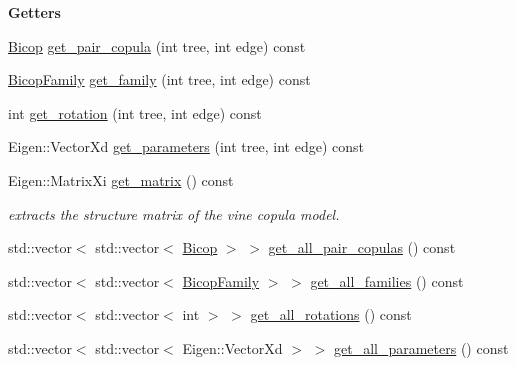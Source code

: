 \begin{Indent}{\bf Getters}\par
\begin{DoxyCompactItemize}
\item 
\hyperlink{classvinecopulib_1_1_bicop}{Bicop} \hyperlink{classvinecopulib_1_1_vinecop_a22262e99414e23dbe7c7f0e773041185}{get\+\_\+pair\+\_\+copula} (int tree, int edge) const 
\item 
\hyperlink{namespacevinecopulib_a42e95cc06d33896199caab0c11ad44f3}{Bicop\+Family} \hyperlink{classvinecopulib_1_1_vinecop_ab2b5aecbe06c5219919f5b3c7436f1da}{get\+\_\+family} (int tree, int edge) const 
\item 
int \hyperlink{classvinecopulib_1_1_vinecop_abfa48760cc636cadce6fa875a883922a}{get\+\_\+rotation} (int tree, int edge) const 
\item 
Eigen\+::\+Vector\+Xd \hyperlink{classvinecopulib_1_1_vinecop_a2ddcc85cb5f2c05edd9093fe863812f6}{get\+\_\+parameters} (int tree, int edge) const 
\item 
Eigen\+::\+Matrix\+Xi \hyperlink{classvinecopulib_1_1_vinecop_aaac38f862f3b8ffd68ca04564fd0cf06}{get\+\_\+matrix} () const \hypertarget{classvinecopulib_1_1_vinecop_aaac38f862f3b8ffd68ca04564fd0cf06}{}\label{classvinecopulib_1_1_vinecop_aaac38f862f3b8ffd68ca04564fd0cf06}

\begin{DoxyCompactList}\small\item\em extracts the structure matrix of the vine copula model. \end{DoxyCompactList}\item 
std\+::vector$<$ std\+::vector$<$ \hyperlink{classvinecopulib_1_1_bicop}{Bicop} $>$ $>$ \hyperlink{classvinecopulib_1_1_vinecop_acb041d08afd6b7efac4f3769273300d7}{get\+\_\+all\+\_\+pair\+\_\+copulas} () const 
\item 
std\+::vector$<$ std\+::vector$<$ \hyperlink{namespacevinecopulib_a42e95cc06d33896199caab0c11ad44f3}{Bicop\+Family} $>$ $>$ \hyperlink{classvinecopulib_1_1_vinecop_adcb572c440756a00dfaea0188caffb85}{get\+\_\+all\+\_\+families} () const 
\item 
std\+::vector$<$ std\+::vector$<$ int $>$ $>$ \hyperlink{classvinecopulib_1_1_vinecop_a7cbfca10a16e4c45f4b5d94343b5fc20}{get\+\_\+all\+\_\+rotations} () const 
\item 
std\+::vector$<$ std\+::vector$<$ Eigen\+::\+Vector\+Xd $>$ $>$ \hyperlink{classvinecopulib_1_1_vinecop_a3ab6a85281503d42f3a07036001bd657}{get\+\_\+all\+\_\+parameters} () const 
\end{DoxyCompactItemize}
\end{Indent}
